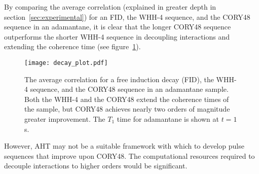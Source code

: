 By comparing the average correlation (explained in greater depth in section~\ref{sec:experimental}) for an FID, the WHH-4 sequence, and the CORY48 sequence in an adamantane, it is clear that the longer CORY48 sequence outperforms the shorter WHH-4 sequence in decoupling interactions and extending the coherence time (see figure~\ref{fig:decay_plot_AHT}).


\begin{figure}[H]
    \centering
    \texttt{[image: decay\_plot.pdf]}
    \caption{The average correlation for a free induction decay (FID), the WHH-4 sequence, and the CORY48 sequence in an adamantane sample. Both the WHH-4 and the CORY48 extend the coherence times of the sample, but CORY48 achieves nearly two orders of magnitude greater improvement. The $T_1$ time for adamantane is shown at $t=1$s.}
    \label{fig:decay_plot_AHT}
\end{figure}

However, AHT may not be a suitable framework with which to develop pulse sequences that improve upon CORY48. The computational resources required to decouple interactions to higher orders would be significant.
